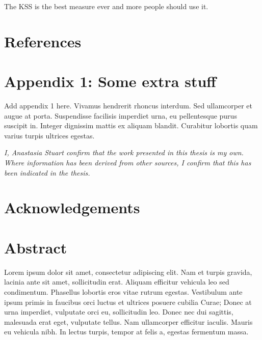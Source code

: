 \documentclass[12pt,a4paper,]{report}
\begin{document}
The KSS is the best measure ever and more people should use it.

\newpage

\footnotesize
\singlespacing
\setlength{\parindent}{0in}

\chapter{References}\label{references}

\newpage

\chapter*{Appendix 1: Some extra
stuff}\label{appendix-1-some-extra-stuff}

Add appendix 1 here. Vivamus hendrerit rhoncus interdum. Sed ullamcorper
et augue at porta. Suspendisse facilisis imperdiet urna, eu pellentesque
purus suscipit in. Integer dignissim mattis ex aliquam blandit.
Curabitur lobortis quam varius turpis ultrices egestas.

\newpage

\vspace*{\fill}

\noindent \textit{
I, Anastasia Stuart confirm that the work presented in this thesis is my own. Where information has been derived from other sources, I confirm that this has been indicated in the thesis.
} \vspace*{\fill}  \newpage

\chapter*{Acknowledgements}\label{acknowledgements-1}

\newpage

\chapter*{Abstract}\label{abstract-1}

Lorem ipsum dolor sit amet, consectetur adipiscing elit. Nam et turpis
gravida, lacinia ante sit amet, sollicitudin erat. Aliquam efficitur
vehicula leo sed condimentum. Phasellus lobortis eros vitae rutrum
egestas. Vestibulum ante ipsum primis in faucibus orci luctus et
ultrices posuere cubilia Curae; Donec at urna imperdiet, vulputate orci
eu, sollicitudin leo. Donec nec dui sagittis, malesuada erat eget,
vulputate tellus. Nam ullamcorper efficitur iaculis. Mauris eu vehicula
nibh. In lectus turpis, tempor at felis a, egestas fermentum massa.
\end{document}
